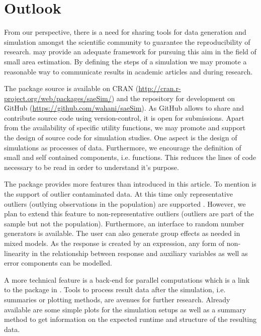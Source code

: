\documentclass[article]{ajs}
\begin{document}
  
\section{Outlook}
\label{sec:outlook}
From our perspective, there is a need for sharing tools for data generation and simulation amongst the scientific community to guarantee the reproducibility of research.  may provide an adequate framework for pursuing this aim in the field of small area estimation. By defining the steps of a simulation we may promote a reasonable way to communicate results in academic articles and during research. 

The package source is available on CRAN (\url{http://cran.r-project.org/web/packages/saeSim/}) and the repository for development on GitHub (\url{https://github.com/wahani/saeSim}). As GitHub allows to share and contribute source code using version-control, it is open for submissions. Apart from the availability of specific utility functions, we may promote and support the design of source code for simulation studies. One aspect is the design of simulations as processes of data. Furthermore, we encourage the definition of small and self contained components, i.e. functions. This reduces the lines of code necessary to be read in order to understand it's purpose. 

The package provides more features than introduced in this article. To mention is the support of outlier contaminated data. At this time only representative outliers (outlying observations in the population) are supported \citep[cf.][]{Cha86}. However, we plan to extend this feature to non-representative outliers (outliers are part of the sample but not the population). Furthermore, an interface to  random number generators is available. The user can also generate group effects as needed in mixed models. As the response is created by an  expression, any form of non-linearity in the relationship between response and auxiliary variables as well as error components can be modelled.

A more technical feature is a back-end for parallel computations which is a link to the  package in  \citep{r14}. Tools to process result data after the simulation, i.e. summaries or plotting methods, are avenues for further research. Already available are some simple plots for the simulation setups as well as a summary method to get information on the expected runtime and structure of the resulting data.

%

\end{document}
